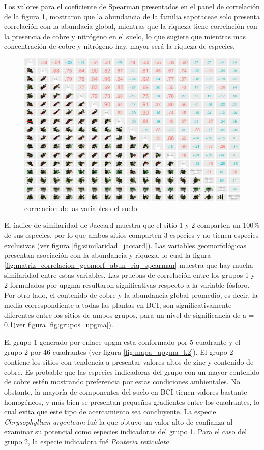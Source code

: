 \documentclass[11pt,]{article}
\begin{document}
Los valores para el coeficiente de Spearman presentados en el panel de
correlación de la figura \ref{fig:p_cor_suelo_ar}, mostraron que la
abundancia de la familia sapotaceae solo presenta correlación con la
abundacia global, mientras que la riqueza tiene correlación con la
presencia de cobre y nitrógeno en el suelo, lo que sugiere que mientras
mas concentración de cobre y nitrógeno hay, mayor será la riqueza de
especies.

\begin{figure}
\centering
\includegraphics{manuscrito_files/figure-latex/unnamed-chunk-4-1.pdf}
\caption{\label{fig:p_cor_suelo_ar}correlacion de las variables del
suelo}
\end{figure}

El índice de similaridad de Jaccard muestra que el sitio 1 y 2 comparten
un 100\% de sus especies, por lo que ambos sitios comparten 3 especies y
no tienen especies exclusivas (ver figura
\ref{fig:similaridad_jaccard}). Las variables geomorfológicas presentan
asociación con la abundancia y riqueza, lo cual la figura
\ref{fig:matriz_correlacion_geomorf_abun_riq_spearman} muestra que hay
mucha similaridad entre estas variables. Las pruebas de correlación
entre los grupos 1 y 2 formulados por upgma resultaron significativas
respecto a la variable fósforo. Por otro lado, el contenido de cobre y
la abundancia global promedio, es decir, la media correspondiente a
todas las plantas en BCI, son significativamente diferentes entre los
sitios de ambos grupos, para un nivel de significancia de a = 0.1(ver
figura \ref{fig:grupos_upgma}).

El grupo 1 generado por enlace upgm esta conformado por 5 cuadrante y el
grupo 2 por 46 cuadrantes (ver figura \ref{fig:mapa_upgma_k2}). El grupo
2 contiene los sitios con tendencia a presentar valores altos de zinc y
contenido de cobre. Es probable que las especies indicadoras del grupo
con un mayor contenido de cobre estén mostrando preferencia por estas
condiciones ambientales. No obstante, la mayoría de componentes del
suelo en BCI tienen valores bastante homogéneos, y más bien se presentan
pequeños gradientes entre los cuadrantes, lo cual evita que este tipo de
acercamiento sea concluyente. La especie \emph{Chrysophyllum argenteum}
fué la que obtuvo un valor alto de confianza al examinar su potencial
como especies indicadoras del grupo 1. Para el caso del grupo 2, la
especie indicadora fué \emph{Pouteria reticulata}.
\end{document}
